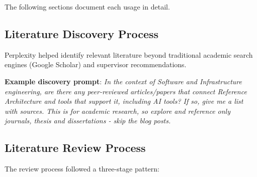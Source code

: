 The following sections document each usage in detail.

\subsection{Literature Discovery Process}

Perplexity helped identify relevant literature beyond traditional academic
search engines (Google Scholar) and supervisor recommendations.

\textbf{Example discovery prompt}: \textit{In the context of Software and Infrastructure engineering,
    are there any peer-reviewed articles/papers that connect Reference Architecture and tools that
    support it, including AI tools? If so, give me a list with sources. This is for academic research,
    so explore and reference only journals, thesis and dissertations - skip the blog posts.}

\subsection{Literature Review Process}

The review process followed a three-stage pattern:

